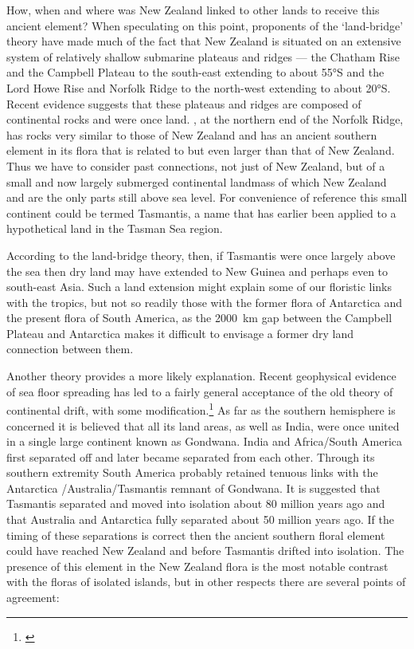 How, when and where was New Zealand linked to other lands to receive this ancient element? When speculating on this point, proponents of the `land-bridge' theory have made much of the fact that New Zealand is situated on an extensive system of relatively shallow submarine plateaus and ridges --- the Chatham Rise and the Campbell Plateau to the south-east extending to about \ang{55}S and the Lord Howe Rise and Norfolk Ridge to the north-west extending to about \ang{20}S.
Recent evidence suggests that these plateaus and ridges are composed of continental rocks and were once land.
, at the northern end of the Norfolk Ridge, has rocks very similar to those of New Zealand and has an ancient southern element in its flora that is related to but even larger than that of New Zealand.
Thus we have to consider past connections, not just of New Zealand, but of a small and now largely submerged continental landmass of which New Zealand and  are the only parts still above sea level.
For convenience of reference this small continent could be termed Tasmantis, a name that has earlier been applied to a hypothetical land in the Tasman Sea region.

According to the land-bridge theory, then, if Tasmantis were once largely above the sea then dry land may have extended to New Guinea and perhaps even to south-east Asia.
Such a land extension might explain some of our floristic links with the tropics, but not so readily those with the former flora of Antarctica and the present flora of South America, as the \SI{2000}{\kilo\metre} gap between the Campbell Plateau and Antarctica makes it difficult to envisage a former dry land connection between them.

Another theory provides a more likely explanation.
Recent geophysical evidence of sea floor spreading has led to a fairly general acceptance of the old theory of continental drift, with some modification.\footnote{\cite{stevens1980new}}
As far as the southern hemisphere is concerned it is believed that all its land areas, as well as India, were once united in a single large continent known as Gondwana.
India and Africa/South America first separated off and later became separated from each other.
Through its southern extremity South America probably retained tenuous links with the Antarctica /Australia/Tasmantis remnant of Gondwana.
It is suggested that Tasmantis separated and moved into isolation about 80 million years ago and that Australia and Antarctica fully separated about 50 million years ago.
If the timing of these separations is correct then the ancient southern floral element could have reached New Zealand and  before Tasmantis drifted into isolation.
The presence of this element in the New Zealand flora is the most notable contrast with the floras of isolated islands, but in other respects there are several points of agreement:

